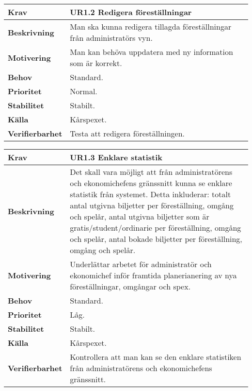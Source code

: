 \documentclass[a4paper, twoside, 11pt, titlepage]{article}
\begin{document}
		\begin {table} [ht] \begin{tabular} { p{2.6cm} p{12.5cm} }
			\hline
			{\sffamily\textbf{Krav}} & {\sffamily\textbf{UR1.2 Redigera föreställningar }} \\
			\hline
			{\sffamily\textbf{Beskrivning}} & {Man ska kunna redigera tillagda föreställningar från administratörs vyn.} \\
			\hline
			{\sffamily\textbf{Motivering}} & {Man kan behöva uppdatera med ny information som är korrekt.} \\
			\hline
			{\sffamily\textbf{Behov}} & {Standard.} \\
			\hline
			{\sffamily\textbf{Prioritet}} & {Normal.} \\
			\hline
			{\sffamily\textbf{Stabilitet}} & {Stabilt.} \\
			\hline
			{\sffamily\textbf{Källa}} & {Kårspexet.} \\
			\hline
			{\sffamily\textbf{Verifierbarhet}} & {Testa att redigera föreställningen.} \\
			\hline
		\end{tabular} \end{table} \FloatBarrier
		\vspace{6mm}

		\begin {table} [ht] \begin{tabular} { p{2.6cm} p{12.5cm} }
			\hline
			{\sffamily\textbf{Krav}} & {\sffamily\textbf{UR1.3 Enklare statistik }} \\
			\hline
			{\sffamily\textbf{Beskrivning}} & {Det skall vara möjligt att från administratörens och ekonomichefens gränssnitt kunna se enklare statistik från systemet. Detta inkluderar: totalt antal utgivna biljetter per föreställning, omgång och spelår, antal utgivna biljetter som är gratis/student/ordinarie per föreställning, omgång och spelår, antal bokade biljetter per föreställning, omgång och spelår.} \\
			\hline
			{\sffamily\textbf{Motivering}} & {Underlättar arbetet för administratör och ekonomichef inför framtida planerianering av nya föreställningar, omgångar och spex.} \\
			\hline
			{\sffamily\textbf{Behov}} & {Standard.} \\
			\hline
			{\sffamily\textbf{Prioritet}} & {Låg.} \\
			\hline
			{\sffamily\textbf{Stabilitet}} & {Stabilt.} \\
			\hline
			{\sffamily\textbf{Källa}} & {Kårspexet.} \\
			\hline
			{\sffamily\textbf{Verifierbarhet}} & {Kontrollera att man kan se den enklare statistiken från administratörens och ekonomichefens gränssnitt.} \\
			\hline
		\end{tabular} \end{table} \FloatBarrier
		\vspace{6mm}
\end{document}
